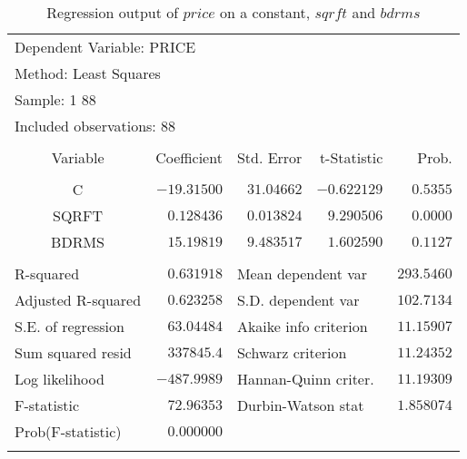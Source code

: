 \documentclass[12pt]{report}
\begin{document}
\begin{table}[H]
	\centering
	\begin{tabular}{lrrrr}
		\multicolumn{3}{l}{Dependent Variable: PRICE}&\multicolumn{1}{c}{}&\multicolumn{1}{c}{}\\
		\multicolumn{3}{l}{Method: Least Squares}&\multicolumn{1}{c}{}&\multicolumn{1}{c}{}\\
		\multicolumn{2}{l}{Sample: 1 88}&\multicolumn{1}{c}{}&\multicolumn{1}{c}{}&\multicolumn{1}{c}{}\\
		\multicolumn{3}{l}{Included observations: 88}&\multicolumn{1}{c}{}&\multicolumn{1}{c}{}\\
		[4.5pt] \hline \\ [-4.5pt]
		\multicolumn{1}{c}{Variable}&\multicolumn{1}{r}{Coefficient}&\multicolumn{1}{r}{Std. Error}&\multicolumn{1}{r}{t-Statistic}&\multicolumn{1}{r}{Prob.}\\
		[4.5pt] \hline \\ [-4.5pt]
		\multicolumn{1}{c}{C}&\multicolumn{1}{r}{$-19.31500$}&\multicolumn{1}{r}{$31.04662$}&\multicolumn{1}{r}{$-0.622129$}&\multicolumn{1}{r}{$0.5355$}\\
		\multicolumn{1}{c}{SQRFT}&\multicolumn{1}{r}{$0.128436$}&\multicolumn{1}{r}{$0.013824$}&\multicolumn{1}{r}{$9.290506$}&\multicolumn{1}{r}{$0.0000$}\\
		\multicolumn{1}{c}{BDRMS}&\multicolumn{1}{r}{$15.19819$}&\multicolumn{1}{r}{$9.483517$}&\multicolumn{1}{r}{$1.602590$}&\multicolumn{1}{r}{$0.1127$}\\
		[4.5pt] \hline \\ [-4.5pt]
		\multicolumn{1}{l}{R-squared}&\multicolumn{1}{r}{$0.631918$}&\multicolumn{2}{l}{Mean dependent var}&\multicolumn{1}{r}{$293.5460$}\\
		\multicolumn{1}{l}{Adjusted R-squared}&\multicolumn{1}{r}{$0.623258$}&\multicolumn{2}{l}{S.D. dependent var}&\multicolumn{1}{r}{$102.7134$}\\
		\multicolumn{1}{l}{S.E. of regression}&\multicolumn{1}{r}{$63.04484$}&\multicolumn{2}{l}{Akaike info criterion}&\multicolumn{1}{r}{$11.15907$}\\
		\multicolumn{1}{l}{Sum squared resid}&\multicolumn{1}{r}{$337845.4$}&\multicolumn{2}{l}{Schwarz criterion}&\multicolumn{1}{r}{$11.24352$}\\
		\multicolumn{1}{l}{Log likelihood}&\multicolumn{1}{r}{$-487.9989$}&\multicolumn{2}{l}{Hannan-Quinn criter.}&\multicolumn{1}{r}{$11.19309$}\\
		\multicolumn{1}{l}{F-statistic}&\multicolumn{1}{r}{$72.96353$}&\multicolumn{2}{l}{Durbin-Watson stat}&\multicolumn{1}{r}{$1.858074$}\\
		\multicolumn{1}{l}{Prob(F-statistic)}&\multicolumn{1}{r}{$0.000000$}&\multicolumn{1}{c}{}&\multicolumn{1}{c}{}&\multicolumn{1}{c}{}\\
		[4.5pt] \hline \\ [-4.5pt]
	\end{tabular}
	\caption{Regression output of $price$ on a constant, $sqrft$ and $bdrms$}
	\label{tbl:regout3}
\end{table}
\end{document}
